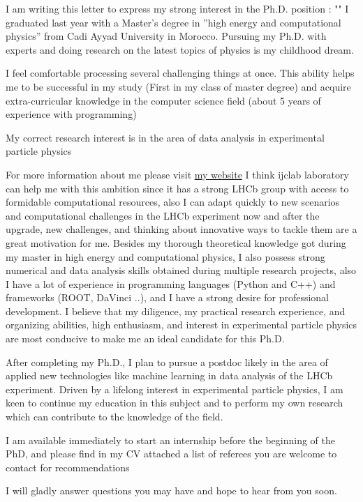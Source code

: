 \begin{cvletter}
I am writing this letter to express my strong interest in the Ph.D. position : "\thesis"
I graduated last year with a Master’s degree in ”high energy and computational physics” from Cadi Ayyad University in Morocco. Pursuing my Ph.D. with experts and doing research on the latest topics of physics is my childhood dream.

I feel comfortable processing several challenging things at once. This ability helps me to be successful in my study (First in my class of master degree) and acquire extra-curricular knowledge in the computer science field (about 5 years of experience with programming)

My correct research interest is in the area of data analysis in experimental particle physics

For more information about me please visit \href{http://ismailezzaki.me/}{my website}
I think ijclab laboratory can help me with this ambition since it has a strong LHCb group with access to formidable computational resources, also I can adapt quickly to new scenarios and computational challenges in the LHCb experiment now and after the upgrade, new challenges, and thinking about innovative ways to tackle them are a great motivation for me.
Besides my thorough theoretical knowledge got during my master in high energy and computational physics, I also possess strong numerical and data analysis skills obtained during multiple research projects, also I have a lot of experience in programming languages (Python and C++) and frameworks (ROOT, DaVinci ..), and I have a strong desire for professional development. I believe that my diligence, my practical research experience, and organizing abilities, high enthusiasm, and interest in experimental particle physics are most conducive to make me an ideal candidate for this Ph.D.

After completing my Ph.D., I plan to pursue a postdoc likely in the area of applied new technologies like machine learning in data analysis of the LHCb experiment. Driven by a lifelong interest in experimental particle physics, I am keen to continue my education in this subject and to perform my own research which can contribute to the knowledge of the field.

I am available immediately to start an internship before the beginning of the PhD, and please find in my CV attached a list of referees you are welcome to contact for recommendations

I will gladly answer questions you may have and hope to hear from you soon.
\end{cvletter}


\makeletterclosing


